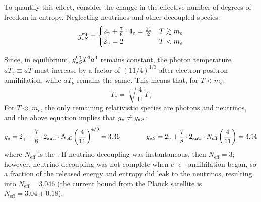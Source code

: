 To quantify this effect, consider the change in the effective number of degrees of freedom in entropy. Neglecting neutrinos and other decoupled species\footnotemark:
\begin{equation*}
  g_{\star S}^\text{eq} =
  \begin{cases}
    2_\gamma + \frac{7}{8} \cdot 4_e = \frac{11}{2} & T \gtrsim m_e \\
    2_\gamma = 2 & T < m_e
  \end{cases}
\end{equation*}


Since, in equilibrium, $ g_{\star S}^\text{eq} T^3 a^3 $ remains constant, the photon temperature $ a T_\gamma \equiv a T $ must increase by a factor of $ (11/4)^{1/3} $ after electron-positron annihilation, while $ a T_\nu $ remains the same. This means that, for $ T < m_e $:
\begin{equation}
  T_\nu = \sqrt[3]{\frac{4}{11}} T_\gamma
  \label{eq:t-nu-gamma}
\end{equation}
For $ T \ll m_e $, the only remaining relativistic species are photons and neutrinos, and the above equation implies that $ g_\star \neq g_{\star S} $:
\begin{equation*}
  g_\star = 2_\gamma + \frac{7}{8} \cdot 2_\text{anti} \cdot N_\text{eff} \left( \frac{4}{11} \right)^{4/3} = 3.36
  \qquad \qquad
  g_{\star S} = 2_\gamma + \frac{7}{8} \cdot 2_\text{anti} \cdot N_\text{eff} \left( \frac{4}{11} \right) = 3.94
\end{equation*}
where $ N_\text{eff} $ is the . If neutrino decoupling was instantaneous, then $ N_\text{eff} = 3 $; however, neutrino decoupling was not complete when $ e^+ e^- $ annihilation began, so a fraction of the released energy and entropy did leak to the neutrinos, resulting into $ N_\text{eff} = 3.046 $ (the current bound from the Planck satellite is $ N_\text{eff} = 3.04 \pm 0.18 $).

